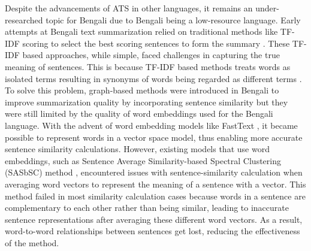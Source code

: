 \documentclass[acmlarge]{acmart}
\begin{document}
Despite the advancements of ATS in other languages, it remains an under-researched topic for Bengali due to Bengali being a low-resource language. Early attempts at Bengali text summarization relied on traditional methods like TF-IDF scoring to select the best scoring sentences to form the summary \cite{Akter-2017-tfidf-3, das-2022-tfidf, sarkar-2012-tfidf, sarkar-2012-tfidf-2}. These TF-IDF based approaches, while simple, faced challenges in capturing the true meaning of sentences. This is because TF-IDF based methods treats words as isolated terms resulting in synonyms of words being regarded as different terms \cite{tas-2017-rev-text-sum-2}. To solve this problem, graph-based methods were introduced in Bengali to improve summarization quality by incorporating sentence similarity but they were still limited by the quality of word embeddings used for the Bengali language. With the advent of word embedding models like FastText \cite{grave-etal-2018-fasttext}, it became possible to represent words in a vector space model, thus enabling more accurate sentence similarity calculations. However, existing models that use word embeddings, such as Sentence Average Similarity-based Spectral Clustering (SASbSC) method \cite{roychowdhury-etal-2022-spectral-base}, encountered issues with sentence-similarity calculation when averaging word vectors to represent the meaning of a sentence with a vector. This method failed in most similarity calculation cases because words in a sentence are complementary to each other rather than being similar, leading to inaccurate sentence representations after averaging these different word vectors. As a result, word-to-word relationships between sentences get lost, reducing the effectiveness of the method.\\
\end{document}
